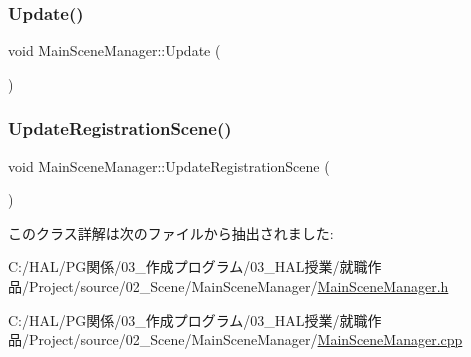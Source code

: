\mbox{\label{class_main_scene_manager_a07a720b6bb727df98ce6d87c9b1cbb5b}} 
\subsubsection{\texorpdfstring{Update()}{Update()}}
{\footnotesize\ttfamily void Main\+Scene\+Manager\+::\+Update (\begin{DoxyParamCaption}{ }\end{DoxyParamCaption})}

\mbox{\label{class_main_scene_manager_a39d8cbebf57b927510f7af4b2c75c25a}} 
\subsubsection{\texorpdfstring{Update\+Registration\+Scene()}{UpdateRegistrationScene()}}
{\footnotesize\ttfamily void Main\+Scene\+Manager\+::\+Update\+Registration\+Scene (\begin{DoxyParamCaption}{ }\end{DoxyParamCaption})}



このクラス詳解は次のファイルから抽出されました\+:\begin{DoxyCompactItemize}
\item 
C\+:/\+H\+A\+L/\+P\+G関係/03\+\_\+作成プログラム/03\+\_\+\+H\+A\+L授業/就職作品/\+Project/source/02\+\_\+\+Scene/\+Main\+Scene\+Manager/\mbox{\hyperlink{_main_scene_manager_8h}{Main\+Scene\+Manager.\+h}}\item 
C\+:/\+H\+A\+L/\+P\+G関係/03\+\_\+作成プログラム/03\+\_\+\+H\+A\+L授業/就職作品/\+Project/source/02\+\_\+\+Scene/\+Main\+Scene\+Manager/\mbox{\hyperlink{_main_scene_manager_8cpp}{Main\+Scene\+Manager.\+cpp}}\end{DoxyCompactItemize}

